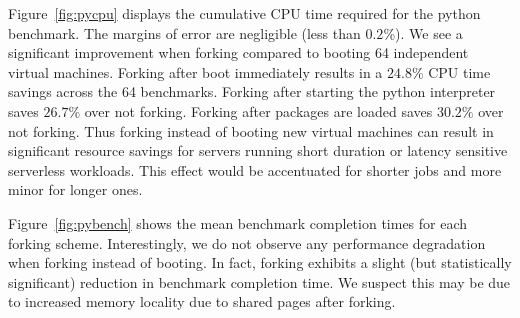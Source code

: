  Figure~\ref{fig:pycpu} displays the cumulative CPU
time required for the python benchmark. The margins of error are negligible
(less than $0.2$\%). We see a significant improvement when forking compared to
booting 64 independent virtual machines. Forking after boot immediately results
in a $24.8$\% CPU time savings across the 64 benchmarks. Forking after starting
the python interpreter saves $26.7$\% over not forking. Forking after packages
are loaded saves $30.2\%$ over not forking. Thus forking instead of booting new
virtual machines can result in significant resource savings for servers running
short duration or latency sensitive serverless workloads. This effect would be
accentuated for shorter jobs and more minor for longer ones.

Figure~\ref{fig:pybench} shows the mean benchmark completion times
for each forking scheme. Interestingly, we do not observe any performance
degradation when forking instead of booting. In fact, forking exhibits a slight
(but statistically significant) reduction in benchmark completion time. We
suspect this may be due to increased memory locality due to shared pages after
forking.
